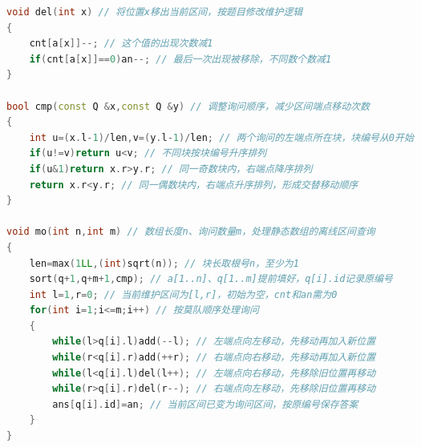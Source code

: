 \documentclass[10pt,landscape,a4paper]{article}
\begin{document}
\begin{multicols*}{3}
\begin{lstlisting}[language=C++]
void del(int x) // 将位置x移出当前区间，按题目修改维护逻辑
{
    cnt[a[x]]--; // 这个值的出现次数减1
    if(cnt[a[x]]==0)an--; // 最后一次出现被移除，不同数个数减1
}

bool cmp(const Q &x,const Q &y) // 调整询问顺序，减少区间端点移动次数
{
    int u=(x.l-1)/len,v=(y.l-1)/len; // 两个询问的左端点所在块，块编号从0开始
    if(u!=v)return u<v; // 不同块按块编号升序排列
    if(u&1)return x.r>y.r; // 同一奇数块内，右端点降序排列
    return x.r<y.r; // 同一偶数块内，右端点升序排列，形成交替移动顺序
}

void mo(int n,int m) // 数组长度n、询问数量m，处理静态数组的离线区间查询
{
    len=max(1LL,(int)sqrt(n)); // 块长取根号n，至少为1
    sort(q+1,q+m+1,cmp); // a[1..n]、q[1..m]提前填好，q[i].id记录原编号
    int l=1,r=0; // 当前维护区间为[l,r]，初始为空，cnt和an需为0
    for(int i=1;i<=m;i++) // 按莫队顺序处理询问
    {
        while(l>q[i].l)add(--l); // 左端点向左移动，先移动再加入新位置
        while(r<q[i].r)add(++r); // 右端点向右移动，先移动再加入新位置
        while(l<q[i].l)del(l++); // 左端点向右移动，先移除旧位置再移动
        while(r>q[i].r)del(r--); // 右端点向左移动，先移除旧位置再移动
        ans[q[i].id]=an; // 当前区间已变为询问区间，按原编号保存答案
    }
}
\end{lstlisting}

\end{multicols*}
\end{document}
